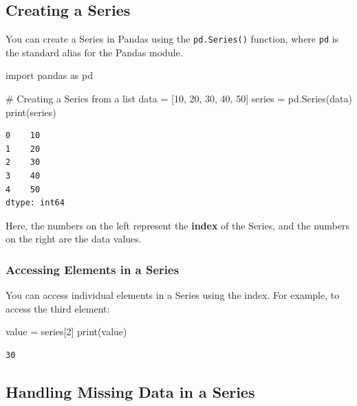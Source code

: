 \documentclass[
  letterpaper,
  DIV=11,
  numbers=noendperiod]{scrreprt}
\newenvironment{Shaded}{\begin{snugshade}}{\end{snugshade}}
\newcommand{\BuiltInTok}[1]{\textcolor[rgb]{0.00,0.23,0.31}{#1}}
\newcommand{\CommentTok}[1]{\textcolor[rgb]{0.37,0.37,0.37}{#1}}
\newcommand{\DecValTok}[1]{\textcolor[rgb]{0.68,0.00,0.00}{#1}}
\newcommand{\ImportTok}[1]{\textcolor[rgb]{0.00,0.46,0.62}{#1}}
\newcommand{\NormalTok}[1]{\textcolor[rgb]{0.00,0.23,0.31}{#1}}
\newcommand{\OperatorTok}[1]{\textcolor[rgb]{0.37,0.37,0.37}{#1}}
\begin{document}
\hypertarget{creating-a-series}{%
\subsection{Creating a Series}\label{creating-a-series}}

You can create a Series in Pandas using the \texttt{pd.Series()}
function, where \texttt{pd} is the standard alias for the Pandas module.

\begin{Shaded}
\begin{Highlighting}[]
\ImportTok{import}\NormalTok{ pandas }\ImportTok{as}\NormalTok{ pd}

\CommentTok{\# Creating a Series from a list}
\NormalTok{data }\OperatorTok{=}\NormalTok{ [}\DecValTok{10}\NormalTok{, }\DecValTok{20}\NormalTok{, }\DecValTok{30}\NormalTok{, }\DecValTok{40}\NormalTok{, }\DecValTok{50}\NormalTok{]}
\NormalTok{series }\OperatorTok{=}\NormalTok{ pd.Series(data)}
\BuiltInTok{print}\NormalTok{(series)}
\end{Highlighting}
\end{Shaded}

\begin{verbatim}
0    10
1    20
2    30
3    40
4    50
dtype: int64
\end{verbatim}

Here, the numbers on the left represent the \textbf{index} of the
Series, and the numbers on the right are the data values.

\hypertarget{accessing-elements-in-a-series}{%
\subsubsection{Accessing Elements in a
Series}\label{accessing-elements-in-a-series}}

You can access individual elements in a Series using the index. For
example, to access the third element:

\begin{Shaded}
\begin{Highlighting}[]
\NormalTok{value }\OperatorTok{=}\NormalTok{ series[}\DecValTok{2}\NormalTok{]}
\BuiltInTok{print}\NormalTok{(value)}
\end{Highlighting}
\end{Shaded}

\begin{verbatim}
30
\end{verbatim}

\hypertarget{handling-missing-data-in-a-series}{%
\subsection{Handling Missing Data in a
Series}\label{handling-missing-data-in-a-series}}
\end{document}
